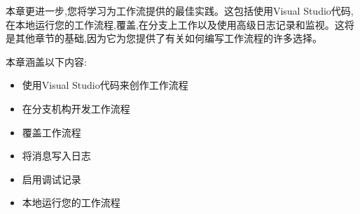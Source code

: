 本章更进一步,您将学习为工作流提供的最佳实践。这包括使用Visual Studio代码,在本地运行您的工作流程,覆盖,在分支上工作以及使用高级日志记录和监视。这将是其他章节的基础,因为它为您提供了有关如何编写工作流程的许多选择。

本章涵盖以下内容:

\begin{itemize}
\item 
使用Visual Studio代码来创作工作流程

\item 
在分支机构开发工作流程

\item 
覆盖工作流程

\item 
将消息写入日志

\item 
启用调试记录

\item 
本地运行您的工作流程
\end{itemize}